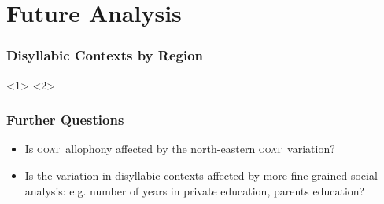 \documentclass[
xcolor=table,
PHONON=true]
{beamer}
\newcommand{\goat}{\textsc{goat}~}
\begin{document}
\section{Future Analysis}
	\begin{frame}
		\frametitle{Disyllabic Contexts by Region}
		<1>
		<2>
	\end{frame}
	\begin{frame}
		\frametitle{Further Questions}
		\begin{itemize}
			\item Is \goat allophony affected by the north-eastern \goat variation?
			\item Is the variation in disyllabic contexts affected by more fine grained social analysis: e.g. number of years in private education, parents education?
		\end{itemize}
	\end{frame}
	
%		
\end{document}
